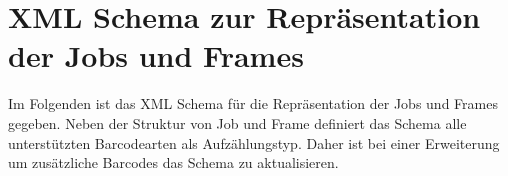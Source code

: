 \chapter{XML Schema zur Repräsentation der Jobs und Frames}
\writtenby{\dcauthornameewie}%
Im Folgenden ist das XML Schema für die Repräsentation der Jobs und Frames gegeben.
Neben der Struktur von Job und Frame definiert das Schema alle unterstützten Barcodearten als Aufzählungstyp.
Daher ist bei einer Erweiterung um zusätzliche Barcodes das Schema zu aktualisieren.

